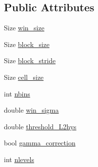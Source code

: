 \subsection*{Public Attributes}
\begin{DoxyCompactItemize}
\item 
Size \hyperlink{structcv_1_1ocl_1_1HOGDescriptor_a64a0fb7b26799b3b7b62ecc3db2c5601}{win\-\_\-size}
\item 
Size \hyperlink{structcv_1_1ocl_1_1HOGDescriptor_a2d0121236387d4113568acb367b5f2ef}{block\-\_\-size}
\item 
Size \hyperlink{structcv_1_1ocl_1_1HOGDescriptor_aae17ffc7bbc09ec8f7485a00724fc9b0}{block\-\_\-stride}
\item 
Size \hyperlink{structcv_1_1ocl_1_1HOGDescriptor_af6d032325c0a50fdf0faf4cf559ee4cf}{cell\-\_\-size}
\item 
int \hyperlink{structcv_1_1ocl_1_1HOGDescriptor_ab2b56c734be1244d99ed925580e1e54e}{nbins}
\item 
double \hyperlink{structcv_1_1ocl_1_1HOGDescriptor_ab022766fbe3ac26172e15cefaa4c5a25}{win\-\_\-sigma}
\item 
double \hyperlink{structcv_1_1ocl_1_1HOGDescriptor_aa46d855bd7e5532380e5a96f97f90b11}{threshold\-\_\-\-L2hys}
\item 
bool \hyperlink{structcv_1_1ocl_1_1HOGDescriptor_ab27413637f05ea0eac7a0dfcc2d1921b}{gamma\-\_\-correction}
\item 
int \hyperlink{structcv_1_1ocl_1_1HOGDescriptor_a73e83320d5318b5703a6ca9b05038ab2}{nlevels}
\end{DoxyCompactItemize}

